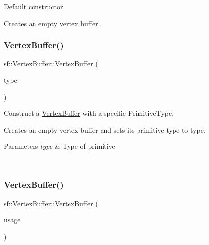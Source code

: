 Default constructor. 

Creates an empty vertex buffer. \begin{DoxyVerb}\end{DoxyVerb}
 \mbox{\label{classsf_1_1_vertex_buffer_a3f51dcd61dac52be54ba7b22ebdea7c8}} 
\subsubsection{\texorpdfstring{VertexBuffer()}{VertexBuffer()}\hspace{0.1cm}{\footnotesize\ttfamily [2/5]}}
{\footnotesize\ttfamily sf\+::\+Vertex\+Buffer\+::\+Vertex\+Buffer (\begin{DoxyParamCaption}\item[{\mbox{\hyperlink{group__graphics_ga5ee56ac1339984909610713096283b1b}{Primitive\+Type}}}]{type }\end{DoxyParamCaption})\hspace{0.3cm}{\ttfamily [explicit]}}



Construct a \mbox{\hyperlink{classsf_1_1_vertex_buffer}{Vertex\+Buffer}} with a specific Primitive\+Type. 

Creates an empty vertex buffer and sets its primitive type to {\ttfamily type}.


\begin{DoxyParams}{Parameters}
{\em type} & Type of primitive \begin{DoxyVerb}\end{DoxyVerb}
 \\
\hline
\end{DoxyParams}
\mbox{\label{classsf_1_1_vertex_buffer_af2dce0a43e061e5f91b97cf7267427e3}} 
\subsubsection{\texorpdfstring{VertexBuffer()}{VertexBuffer()}\hspace{0.1cm}{\footnotesize\ttfamily [3/5]}}
{\footnotesize\ttfamily sf\+::\+Vertex\+Buffer\+::\+Vertex\+Buffer (\begin{DoxyParamCaption}\item[{\mbox{\hyperlink{classsf_1_1_vertex_buffer_a3a531528684e63ecb45edd51282f5cb7}{Usage}}}]{usage }\end{DoxyParamCaption})\hspace{0.3cm}{\ttfamily [explicit]}}



